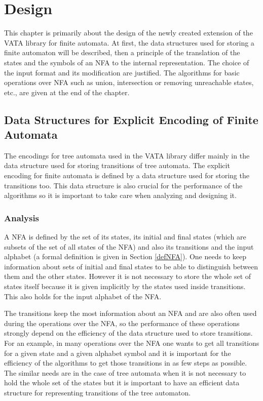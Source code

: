 \chapter{Design}
\label{design}
This chapter is primarily about the design of the newly created extension of the VATA library for finite automata. 
At first, the data structures used for storing a finite automaton will be described, then a principle of the translation of the states and the symbols of an NFA 
to the internal representation. The choice of the input format and its modification are justified.  
The algorithms for basic operations over NFA such as union, intersection or removing unreachable states, etc., are given at the end of the chapter.

\section{Data Structures for Explicit Encoding of Finite Automata}
The encodings for tree automata used in the VATA library differ mainly in the data structure used for storing transitions of tree automata. The explicit encoding
for finite automata is defined by a data structure used for storing the transitions too. 
This data structure is also crucial for the performance of the algorithms so it is important to take care when analyzing and designing it. 

\label{data structure explicit}
\subsection{Analysis}
\label{analysis}
A NFA is defined by the set of its states, its initial and final states (which are subsets of the set of all states of the NFA) and also its
transitions and the input alphabet (a formal definition is given in Section \ref{defNFA}). 
One needs to keep information about sets of initial and final states to be able to distinguish
between them and the other states. However it is not necessary to store the whole set of states itself because it is given implicitly by the states used 
inside transitions. This also holds for the input alphabet of the NFA. 

The transitions keep the most information about an NFA and are also often used
during the operations over the NFA, so the performance of these operations strongly depend on the efficiency of the data structure used to store transitions. 
For an example, in many operations over the NFA one wants to get all transitions for a given state and a given alphabet symbol and it is important for 
the efficiency of the algorithms to get those transitions in as few steps as possible. The similar needs are in the case
of tree automata when it is not necessary to hold the whole set of the states but it is important to have an efficient data structure for representing 
transitions of the tree automaton.

